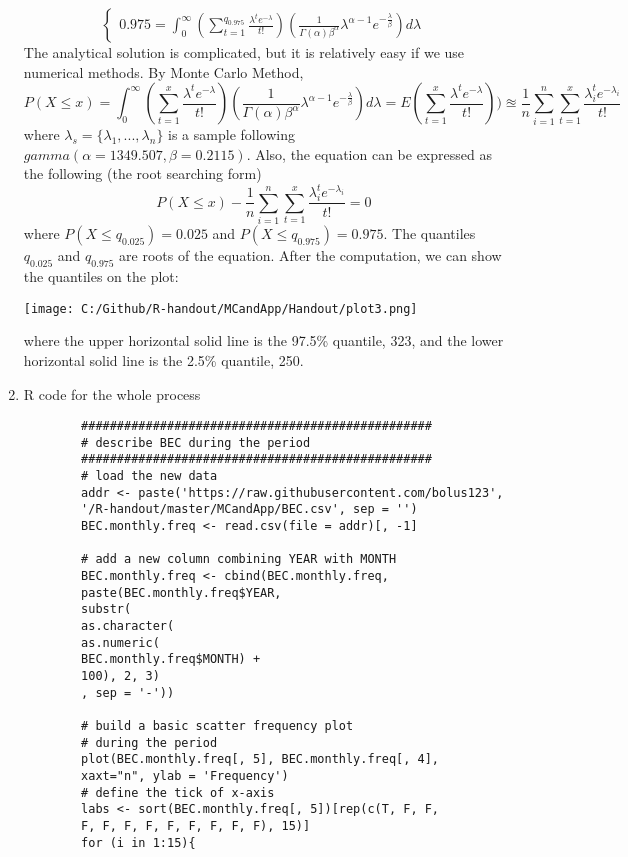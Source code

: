 \begin{enumerate}
\begin{equation*}
\begin{cases}
		0.975 = \int_{0}^{\infty}(\sum_{t = 1}^{q_{0.975}}\frac{\lambda^{t}e^{-\lambda}}{t!})(\frac{1}{\Gamma(\alpha)\beta^{\alpha}}\lambda^{\alpha - 1}e^{-\frac{\lambda}{\beta}}) d \lambda
		\end{cases}
	\end{equation*}
	The analytical solution is complicated, but it is relatively easy if we use numerical methods. By Monte Carlo Method,
	\begin{equation*}
		P(X \le x) = \int_{0}^{\infty}(\sum_{t = 1}^{x}\frac{\lambda^{t}e^{-\lambda}}{t!})(\frac{1}{\Gamma(\alpha)\beta^{\alpha}}\lambda^{\alpha - 1}e^{-\frac{\lambda}{\beta}}) d \lambda = E(\sum_{t = 1}^{x}\frac{\lambda^{t}e^{-\lambda}}{t!})) \approxeq \frac{1}{n} \sum_{i = 1}^{n} \sum_{t = 1}^{x}\frac{\lambda_i^{t}e^{-\lambda_i}}{t!}
	\end{equation*}
	where $\lambda_s = \{\lambda_1,...,\lambda_n \}$ is a sample following $gamma(\alpha= 1349.507, \beta = 0.2115)$. Also, the equation can be expressed as the following (the root searching form)
	\begin{equation*}
		P(X \le x) - \frac{1}{n} \sum_{i = 1}^{n} \sum_{t = 1}^{x}\frac{\lambda_i^{t}e^{-\lambda_i}}{t!} = 0
	\end{equation*}
	where $P(X \le q_{0.025}) = 0.025$ and $P(X \le  q_{0.975}) = 0.975$. The quantiles $q_{0.025}$ and $q_{0.975}$ are roots of the equation. After the computation, we can show the quantiles on the plot:
	\begin{center}
		\texttt{[image: C:/Github/R-handout/MCandApp/Handout/plot3.png]}
	\end{center}
	where the upper horizontal solid line is the 97.5\% quantile, 323, and the lower horizontal solid line is the 2.5\% quantile, 250.
	\item R code for the whole process
	\begin{verbatim}
		#################################################
		# describe BEC during the period
		#################################################
		# load the new data
		addr <- paste('https://raw.githubusercontent.com/bolus123', 
		'/R-handout/master/MCandApp/BEC.csv', sep = '')
		BEC.monthly.freq <- read.csv(file = addr)[, -1]
		
		# add a new column combining YEAR with MONTH
		BEC.monthly.freq <- cbind(BEC.monthly.freq, 
		paste(BEC.monthly.freq$YEAR, 
		substr(
		as.character(
		as.numeric(
		BEC.monthly.freq$MONTH) + 
		100), 2, 3)
		, sep = '-'))
		
		# build a basic scatter frequency plot 
		# during the period
		plot(BEC.monthly.freq[, 5], BEC.monthly.freq[, 4], 
		xaxt="n", ylab = 'Frequency')
		# define the tick of x-axis
		labs <- sort(BEC.monthly.freq[, 5])[rep(c(T, F, F, 
		F, F, F, F, F, F, F, F, F), 15)]
		for (i in 1:15){
		

\end{verbatim}
\end{enumerate}

